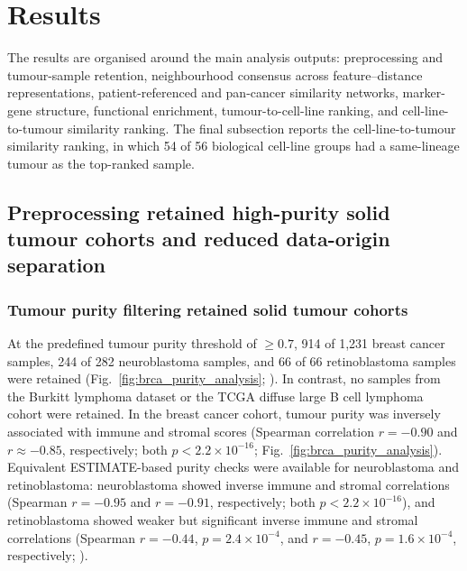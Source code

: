 \section{Results}

The results are organised around the main analysis outputs: preprocessing and
tumour-sample retention, neighbourhood consensus across feature--distance
representations, patient-referenced and pan-cancer similarity networks,
marker-gene structure, functional enrichment, tumour-to-cell-line ranking, and
cell-line-to-tumour similarity ranking. The final subsection reports the
cell-line-to-tumour similarity ranking, in
which 54 of 56 biological cell-line groups had a same-lineage tumour as the
top-ranked sample.

\subsection{Preprocessing retained high-purity solid tumour cohorts and reduced data-origin separation}

\subsubsection{Tumour purity filtering retained solid tumour cohorts}
At the predefined tumour purity threshold of $\geq 0.7$, 914 of 1{,}231 breast cancer samples, 244 of 282 neuroblastoma samples, and 66 of 66 retinoblastoma samples were retained (Fig.~\ref{fig:brca_purity_analysis}; ). In contrast, no samples from the Burkitt lymphoma dataset or the TCGA diffuse large B cell lymphoma cohort were retained. In the breast cancer cohort, tumour purity was inversely associated with immune and stromal scores (Spearman correlation \(r = -0.90\) and \(r \approx -0.85\), respectively; both \(p < 2.2 \times 10^{-16}\); Fig.~\ref{fig:brca_purity_analysis}). Equivalent ESTIMATE-based purity checks were available for neuroblastoma and retinoblastoma: neuroblastoma showed inverse immune and stromal correlations (Spearman \(r = -0.95\) and \(r = -0.91\), respectively; both \(p < 2.2 \times 10^{-16}\)), and retinoblastoma showed weaker but significant inverse immune and stromal correlations (Spearman \(r = -0.44\), \(p = 2.4 \times 10^{-4}\), and \(r = -0.45\), \(p = 1.6 \times 10^{-4}\), respectively; ).


